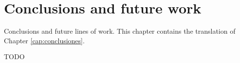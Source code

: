 \chapter*{Conclusions and future work}
\label{cap:conclusions}

Conclusions and future lines of work. This chapter contains the translation of Chapter \ref{cap:conclusiones}.

TODO
